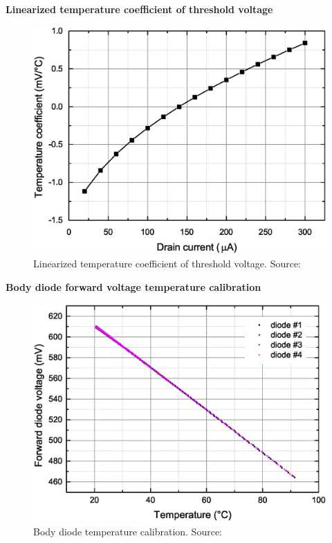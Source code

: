     \bigskip \textbf{Linearized temperature coefficient of threshold voltage}
    \begin{figure}[H]
        \centering
        \includegraphics[width=0.56\paperwidth]{img/05/mg_tc_coefficients.eps}
        \caption{Linearized temperature coefficient of threshold voltage. Source: \cite{MGThesis}}
    \end{figure}

    \bigskip \textbf{Body diode forward voltage temperature calibration}
    \begin{figure}[H]
        \centering
        \includegraphics[width=0.7\paperwidth]{img/05/mg_diode_temp.eps}
        \caption{Body diode temperature calibration. Source: \cite{MGThesis}}
    \end{figure}

